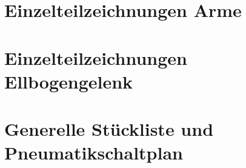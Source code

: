 \section{Einzelteilzeichnungen Arme}
\newpage
\setlength{\voffset}{0cm}
\setlength{\hoffset}{0cm}









%
\newpage
\setlength{\voffset}{-2.5 cm}
\setlength{\hoffset}{-2 cm}
\section{Einzelteilzeichnungen Ellbogengelenk}
\newpage
\setlength{\voffset}{0cm}
\setlength{\hoffset}{0cm}


% 
\newpage
\setlength{\voffset}{-2.5 cm}
\setlength{\hoffset}{-2 cm}
\section{Generelle Stückliste und Pneumatikschaltplan}
\newpage
\setlength{\voffset}{0 cm}
\setlength{\hoffset}{0 cm}




\newpage
\setlength{\voffset}{-2.5 cm}
\setlength{\hoffset}{-2 cm}